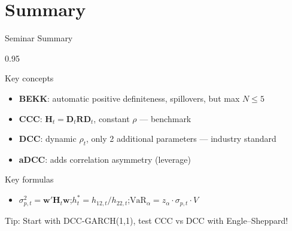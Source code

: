 \documentclass[9pt, aspectratio=169, t]{beamer}
\begin{document}
\section{Summary}

\begin{frame}{Seminar Summary}
    \begin{cminipage}{0.95\textwidth}
    {\footnotesize
    \vspace{-2mm}
    \begin{block}{Key concepts}
        \begin{itemize}\setlength{\itemsep}{-1pt}
            \item \textbf{BEKK}: automatic positive definiteness, spillovers, but max $N \leq 5$
            \item \textbf{CCC}: $\mathbf{H}_t = \mathbf{D}_t\mathbf{R}\mathbf{D}_t$, constant $\rho$ --- benchmark
            \item \textbf{DCC}: dynamic $\rho_t$, only 2 additional parameters --- industry standard
            \item \textbf{aDCC}: adds correlation asymmetry (leverage)
        \end{itemize}
    \end{block}
    \vspace{-1mm}
    \begin{block}{Key formulas}
        \begin{itemize}\setlength{\itemsep}{-1pt}
            \item $\sigma_{p,t}^2 = \mathbf{w}'\mathbf{H}_t\mathbf{w}$;\quad $h_t^* = h_{12,t}/h_{22,t}$;\quad $\text{VaR}_\alpha = z_\alpha \cdot \sigma_{p,t} \cdot V$
        \end{itemize}
    \end{block}
    \vspace{-1mm}
    \begin{alertblock}{Tip: Start with DCC-GARCH(1,1), test CCC vs DCC with Engle--Sheppard!}
    \end{alertblock}
    }
    \end{cminipage}
\end{frame}
\end{document}
